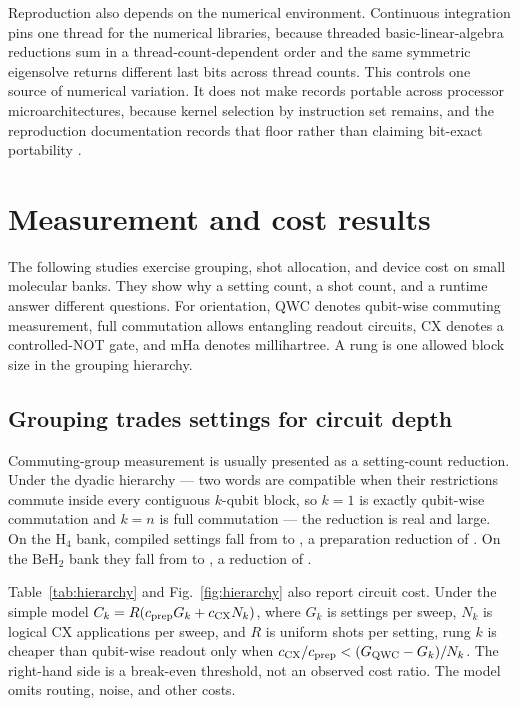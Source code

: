 \documentclass[aps,pra,reprint,superscriptaddress,nofootinbib,floatfix,
  showkeys]{revtex4-2}
\begin{document}
Reproduction also depends on the numerical environment.  Continuous integration pins one thread for the
numerical libraries, because threaded basic-linear-algebra reductions sum in a
thread-count-dependent order and the same symmetric eigensolve returns different
last bits across thread counts.  This controls one source of numerical variation.  It does not make records portable across processor
microarchitectures, because kernel selection by instruction set remains, and the
reproduction documentation records that floor rather than claiming bit-exact
portability \cite{peng2011reproducible,wilson2017practices}.

\section{Measurement and cost results}
\label{sec:admitted}

The following studies exercise grouping, shot allocation, and device cost on
small molecular banks. They show why a setting count, a shot count, and a runtime
answer different questions. For orientation, QWC denotes qubit-wise commuting
measurement, full commutation allows entangling readout circuits, CX denotes a
controlled-NOT gate, and mHa denotes millihartree. A rung is one allowed block
size in the grouping hierarchy.

\subsection{Grouping trades settings for circuit depth}

Commuting-group measurement is usually presented as a setting-count reduction.
Under the dyadic hierarchy --- two words are compatible when their restrictions
commute inside every contiguous $k$-qubit block, so $k=1$ is exactly qubit-wise
commutation and $k=n$ is full commutation --- the reduction is real and large.
On the H$_4$ bank, compiled settings fall from \cqcHFourSettingsQWC{} to
\cqcHFourSettingsFull{}, a preparation reduction of \cqcHFourPrepReduction{}.
On the BeH$_2$ bank they fall from \cqcBeHSettingsQWC{} to
\cqcBeHSettingsFull{}, a reduction of \cqcBeHPrepReduction{}.

Table~\ref{tab:hierarchy} and Fig.~\ref{fig:hierarchy} also report circuit
cost. Under the simple model $C_k=R(c_{\rm prep}G_k+c_{\rm CX}N_k)$,
where $G_k$ is settings per sweep, $N_k$ is logical CX applications per sweep,
and $R$ is uniform shots per setting, rung $k$ is cheaper than qubit-wise
readout only when $c_{\rm CX}/c_{\rm prep} < (G_{\rm QWC}-G_k)/N_k$. The right-hand
side is a break-even threshold, not an observed cost ratio. The model omits
routing, noise, and other costs.
\end{document}
